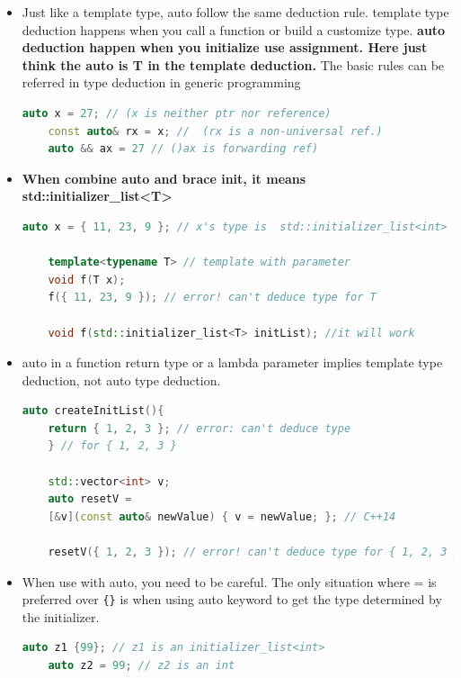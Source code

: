 \documentclass[a4paper,12pt,twoside]{book}
\begin{document}
\begin{itemize}
	\item Just like a template type, auto follow the same deduction rule. template type deduction happens when you call a function or build a customize type. \textbf{auto deduction happen when you initialize use assignment. Here  just think the auto is T in the template deduction.} The basic rules can be referred in type deduction in generic programming
	
	\begin{lstlisting}[frame=single, language=c++]
	auto x = 27; // (x is neither ptr nor reference)
	const auto& rx = x; //  (rx is a non-universal ref.)
	auto && ax = 27 // ()ax is forwarding ref)
	\end{lstlisting}
	
	
	\item \textbf{When combine auto and brace init, it means std::initializer\_list<T>}
	
	\begin{lstlisting}[frame=single, language=c++]
	auto x = { 11, 23, 9 }; // x's type is  std::initializer_list<int>
	
	template<typename T> // template with parameter
	void f(T x);
	f({ 11, 23, 9 }); // error! can't deduce type for T
	
	void f(std::initializer_list<T> initList); //it will work
	\end{lstlisting}
	
	\item auto in a function return type or a lambda parameter implies template type deduction, not auto type deduction.
	\begin{lstlisting}[frame=single, language=c++]
	auto createInitList(){
	return { 1, 2, 3 }; // error: can't deduce type
	} // for { 1, 2, 3 }
	
	std::vector<int> v;
	auto resetV =
	[&v](const auto& newValue) { v = newValue; }; // C++14
	
	resetV({ 1, 2, 3 }); // error! can't deduce type for { 1, 2, 3 }
	\end{lstlisting}
	
	
	\item When use with auto, you need to be careful. The only situation where = is preferred over \verb={}= is when using auto keyword to get the type determined by the initializer.
	\begin{lstlisting}[frame=single, language=c++]
	auto z1 {99}; // z1 is an initializer_list<int>
	auto z2 = 99; // z2 is an int
	\end{lstlisting}
	

\end{itemize}
\end{document}
